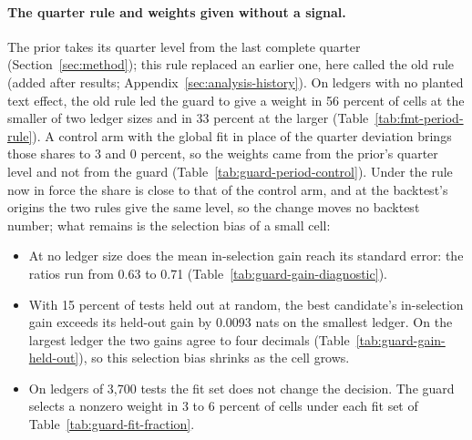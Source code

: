 \paragraph{The quarter rule and weights given without a signal.}
\label{sec:guard-period}
The prior takes its quarter level from the last complete quarter (Section~\ref{sec:method}); this rule replaced an earlier one, here called the old rule (added after results; Appendix~\ref{sec:analysis-history}).
On ledgers with no planted text effect, the old rule led the guard to give a weight in 56 percent of cells at the smaller of two ledger sizes and in 33 percent at the larger (Table~\ref{tab:fmt-period-rule}).
A control arm with the global fit in place of the quarter deviation brings those shares to 3 and 0 percent, so the weights came from the prior's quarter level and not from the guard (Table~\ref{tab:guard-period-control}).
Under the rule now in force the share is close to that of the control arm, and at the backtest's origins the two rules give the same level, so the change moves no backtest number; what remains is the selection bias of a small cell:
\begin{itemize}
\item At no ledger size does the mean in-selection gain reach its standard error: the ratios run from 0.63 to 0.71 (Table~\ref{tab:guard-gain-diagnostic}).
\item With 15 percent of tests held out at random, the best candidate's in-selection gain exceeds its held-out gain by 0.0093 nats on the smallest ledger. On the largest ledger the two gains agree to four decimals (Table~\ref{tab:guard-gain-held-out}), so this selection bias shrinks as the cell grows.
\item On ledgers of 3,700 tests the fit set does not change the decision. The guard selects a nonzero weight in 3 to 6 percent of cells under each fit set of Table~\ref{tab:guard-fit-fraction}.
\end{itemize}

